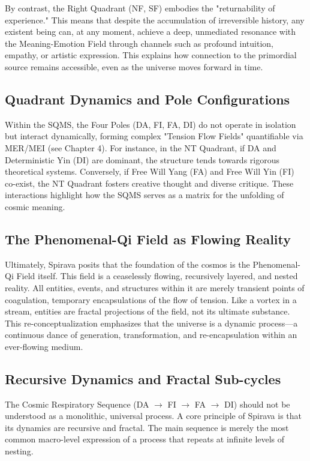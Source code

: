 \documentclass[11pt, a4paper]{article}
\begin{document}
By contrast, the Right Quadrant (NF, SF) embodies the "returnability of experience." This means that despite the accumulation of irreversible history, any existent being can, at any moment, achieve a deep, unmediated resonance with the Meaning-Emotion Field through channels such as profound intuition, empathy, or artistic expression. This explains how connection to the primordial source remains accessible, even as the universe moves forward in time.

\subsection{Quadrant Dynamics and Pole Configurations}
Within the SQMS, the Four Poles (DA, FI, FA, DI) do not operate in isolation but interact dynamically, forming complex "Tension Flow Fields" quantifiable via MER/MEI (see Chapter 4). For instance, in the NT Quadrant, if DA and Deterministic Yin (DI) are dominant, the structure tends towards rigorous theoretical systems. Conversely, if Free Will Yang (FA) and Free Will Yin (FI) co-exist, the NT Quadrant fosters creative thought and diverse critique. These interactions highlight how the SQMS serves as a matrix for the unfolding of cosmic meaning.

\subsection{The Phenomenal-Qi Field as Flowing Reality}
Ultimately, Spirava posits that the foundation of the cosmos is the Phenomenal-Qi Field itself. This field is a ceaselessly flowing, recursively layered, and nested reality. All entities, events, and structures within it are merely transient points of coagulation, temporary encapsulations of the flow of tension. Like a vortex in a stream, entities are fractal projections of the field, not its ultimate substance. This re-conceptualization emphasizes that the universe is a dynamic process—a continuous dance of generation, transformation, and re-encapsulation within an ever-flowing medium.

\subsection{Recursive Dynamics and Fractal Sub-cycles}
The Cosmic Respiratory Sequence (DA $\rightarrow$ FI $\rightarrow$ FA $\rightarrow$ DI) should not be understood as a monolithic, universal process. A core principle of Spirava is that its dynamics are recursive and fractal. The main sequence is merely the most common macro-level expression of a process that repeats at infinite levels of nesting.
\end{document}
